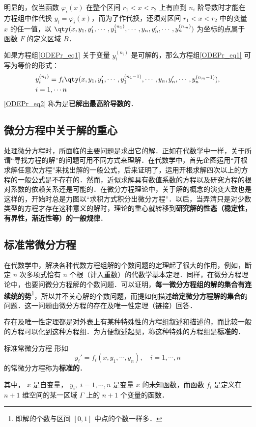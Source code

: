 明显的，仅当函数 $\varphi_i(x)$ 在整个区间 $r_1<x<r_2$ 上有直到 $n_i$ 阶导数时才能在方程组中作代换 $y_i=\varphi_i(x)$，而为了作代换，还须对区间 $r_1<x<r_2$ 中的变量 $x$ 的任一值，以 $\qty(x,y_1,y_1',\cdots,y_1^{(n_1)},\cdots,y_n,y_n',\cdots,y_n^{(n_m)})$ 为坐标的点属于函数 $F$ 的定义区域 $B$．

如果方程组\autoref{ODEPr_eq1} 关于变量 $y_i^{(n_i)}$ 是可解的，那么方程组\autoref{ODEPr_eq1} 可写为等价的形式： 
\begin{equation}\label{ODEPr_eq2}
\begin{aligned}
&y_i^{(n_i)}=f_i\qty(x,y_1,y_1',\cdots,y_1^{(n_1-1)},\cdots,y_n,y_n',\cdots,y_n^{(n_m-1)}),\\
& i=1,\cdots n
\end{aligned}
\end{equation}
\autoref{ODEPr_eq2} 称为是\textbf{已解出最高阶导数的}．
\subsection{微分方程中关于解的重心}
处理微分方程时，所面临的主要问题是求出它的解．正如在代数学中一样，关于所谓“寻找方程的解”的问题可用不同方式来理解．在代数学中，首先企图运用“开根求解任意次方程”来找出解的一般公式，后来证明了，运用开根求解四次以上的方程的一般公式是不存在的．然而，近似求解具有数值系数的方程以及研究方程的根对系数的依赖关系还是可能的．在微分方程理论中，关于解的概念的演变大致也是这样的，开始时总是力图以“求积方式积分出微分方程”．以后，当弄清只是对少数类型的方程才存在这种意义的解时，理论的重心就转移到\textbf{研究解的性态（稳定性，有界性，渐近性等）的一般规律}．
\subsection{标准常微分方程}
在代数学中，解决各种代数方程组解的个数问题的定理起了很大的作用，例如，断定 $n$ 次多项式恰有 $n$ 个根（计入重数）的代数学基本定理．同样，在微分方程理论中，也要问微分方程解的个数问题．可以证明，\textbf{每一微分方程组的解的集合有连续统的势}\footnote{即解的个数与区间 $[0,1]$ 中点的个数一样多．}，所以并不关心解的个数问题，而提如何描述\textbf{给定微分方程解的集合}的问题．这一问题由微分方程的存在及唯一性定理（链接）回答．

存在及唯一性定理都是对外表上有某种特殊性的方程组叙述和描述的，而比较一般的方程可以化到这种方程组．为方便叙述起见，称这种特殊的方程组是\textbf{标准的}．

\begin{definition}{标准常微分方程}
形如
\begin{equation}
y_i'=f_i(x,y_1,\cdots,y_n),\quad i=1,\cdots,n
\end{equation}
的常微分方程称为\textbf{标准的}．

其中， $x$ 是自变量， $y_i,\; i=1,\cdots, n$ 是变量 $x$ 的未知函数，而函数 $f_i$ 是定义在 $n+1$ 维空间的某一区域 $\Gamma$ 上的 $n+1$ 个变量的函数．
\end{definition}

